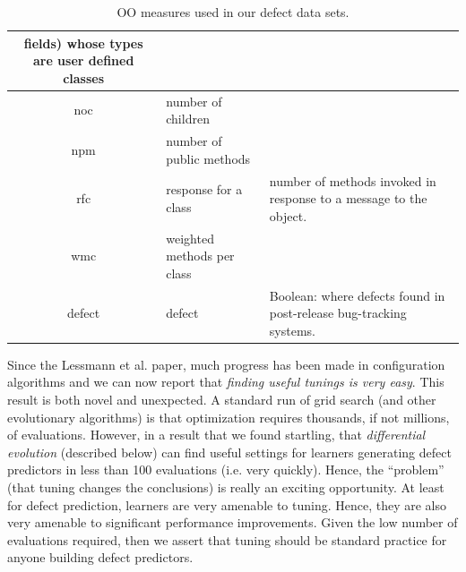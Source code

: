 \documentclass{sig-alternative}
\begin{document}
\begin{table}[t]
\begin{center}
{\begin{tabular}{c|l|p{4.7in}}
fields) whose types are user defined classes\\\hline
noc &  number of children &\\\hline
npm & number of public methods & \\\hline
rfc & response for a class &number of  methods invoked in response to
a message to the object.\\\hline
wmc & weighted methods per class &\\\hline
\rowcolor{lightgray}
defect & defect & Boolean: where defects found in post-release bug-tracking systems.
\end{tabular}
}
\end{center}
\caption{OO measures used in our defect data sets.}\label{tab:ck}
\end{table}



Since the Lessmann et al. paper, much progress has been made in 
configuration algorithms
and we can now report that  {\em finding useful tunings is very easy}.
This result is both novel and unexpected.
A standard run of grid search (and other  evolutionary algorithms)
is  that optimization requires   thousands,
if not millions, of evaluations.  However, in a result that we found startling, that  {\em differential evolution} (described below) can find useful settings for learners generating defect predictors
in less than 100 evaluations (i.e. very quickly).
Hence,   the ``problem'' (that
tuning changes the conclusions) is really
an exciting opportunity. At least for defect prediction,
 learners are very   amenable to tuning. Hence, 
 they are  also very
amenable to significant performance improvements. Given the low
number of evaluations required, then we assert that tuning
  should be standard practice
for anyone building defect predictors.


\end{document}
